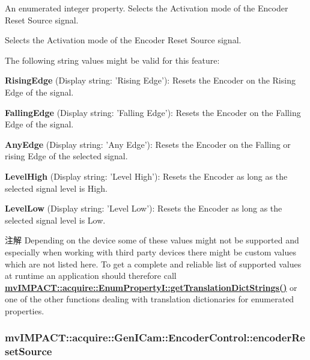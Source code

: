 An enumerated integer property. Selects the Activation mode of the Encoder Reset Source signal. 

Selects the Activation mode of the Encoder Reset Source signal.

The following string values might be valid for this feature\+:
\begin{DoxyItemize}
\item {\bfseries Rising\+Edge} (Display string\+: 'Rising Edge')\+: Resets the Encoder on the Rising Edge of the signal.
\item {\bfseries Falling\+Edge} (Display string\+: 'Falling Edge')\+: Resets the Encoder on the Falling Edge of the signal.
\item {\bfseries Any\+Edge} (Display string\+: 'Any Edge')\+: Resets the Encoder on the Falling or rising Edge of the selected signal.
\item {\bfseries Level\+High} (Display string\+: 'Level High')\+: Resets the Encoder as long as the selected signal level is High.
\item {\bfseries Level\+Low} (Display string\+: 'Level Low')\+: Resets the Encoder as long as the selected signal level is Low.
\end{DoxyItemize}

\begin{DoxyNote}{注解}
Depending on the device some of these values might not be supported and especially when working with third party devices there might be custom values which are not listed here. To get a complete and reliable list of supported values at runtime an application should therefore call {\bfseries \hyperlink{classmv_i_m_p_a_c_t_1_1acquire_1_1_enum_property_i_a0ba6ccbf5ee69784d5d0b537924d26b6}{mv\+I\+M\+P\+A\+C\+T\+::acquire\+::\+Enum\+Property\+I\+::get\+Translation\+Dict\+Strings()}} or one of the other functions dealing with translation dictionaries for enumerated properties. 
\end{DoxyNote}
\hypertarget{classmv_i_m_p_a_c_t_1_1acquire_1_1_gen_i_cam_1_1_encoder_control_a31fc18b202aa161011717d6436a910cd}{
\subsubsection[{encoder\+Reset\+Source}]{ mv\+I\+M\+P\+A\+C\+T\+::acquire\+::\+Gen\+I\+Cam\+::\+Encoder\+Control\+::encoder\+Reset\+Source}}\label{classmv_i_m_p_a_c_t_1_1acquire_1_1_gen_i_cam_1_1_encoder_control_a31fc18b202aa161011717d6436a910cd}


